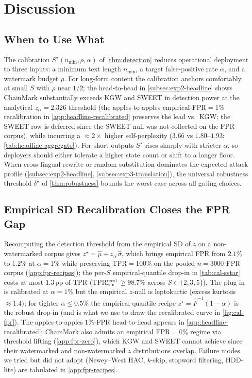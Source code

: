 \section{Discussion}
\label{sec:discussion}

\subsection{When to Use What}

The calibration $S^\star(n_{\min}, \rho, \alpha)$ of
\autoref{thm:detection} reduces operational deployment to three
inputs: a minimum text length $n_{\min}$, a target false-positive
rate $\alpha$, and a watermark budget $\rho$. For long-form content
the calibration anchors comfortably at small $S$ with $\rho$ near
$1/2$; the head-to-head in \autoref{subsec:exp2-headline} shows ChainMark
substantially exceeds KGW and SWEET in detection power at the
analytical $z_\alpha=2.326$ threshold (the apples-to-apples
empirical-FPR$=1\%$ recalibration in \autoref{app:headline-recalibrated}
preserves the lead vs.\ KGW; the SWEET row is deferred since the
SWEET null was not collected on the FPR corpus), while incurring a
$\approx 2\times$ higher self-perplexity ($3.66$ vs $1.80$--$1.93$;
\autoref{tab:headline-aggregate}).
For short outputs $S^\star$ rises sharply with stricter $\alpha$,
so deployers should either tolerate a higher state count or shift
to a longer floor. When cross-lingual rewrite or random substitution
dominates the expected attack profile
(\autoref{subsec:exp2-headline}, \autoref{subsec:exp3-translation}),
the universal robustness threshold $\delta^\star$ of
\autoref{thm:robustness} bounds the worst case across all gating
choices.

\subsection{Empirical SD Recalibration Closes the FPR Gap}

Recomputing the detection threshold from the empirical SD of $z$ on
a non-watermarked corpus gives $z^\star = \hat\mu + z_\alpha\,\hat\sigma$,
which brings empirical FPR from $2.1\%$ to $1.2\%$ at $\alpha=1\%$
while preserving TPR$=100\%$ on the pooled $n{=}3000$ FPR corpus
(\autoref{app:fpr-recipes}); the per-$S$ empirical-quantile drop-in
in \autoref{tab:cal-sstar} costs at most $1.3$\,pp of TPR
(TPR$_{\mathrm{wm}}^{\mathrm{recal.}}\!\geq 98.7\%$ across $S\!\in\!\{2,3,5\}$). The
plug-in is calibrated at $\alpha=1\%$ but the empirical $z$-null is
leptokurtic (excess kurtosis $\approx 1.4$); for tighter $\alpha
\leq 0.5\%$ the empirical-quantile recipe
$z^\star = \hat F^{-1}(1{-}\alpha)$ is the robust drop-in (and is
what we use to draw the recalibrated curve in
\autoref{fig:cal-fpr}). The apples-to-apples $1\%$-FPR head-to-head
appears in \autoref{app:headline-recalibrated}; ChainMark also admits an
empirical FPR$=0\%$ regime via threshold lifting
(\autoref{app:fpr-zero}), which KGW and SWEET cannot achieve since
their watermarked and non-watermarked $z$ distributions overlap.
Failure modes we tried but did not adopt (Newey--West HAC, $k$-skip,
stopword filtering, HDD-lite) are tabulated in
\autoref{app:fpr-recipes}.


